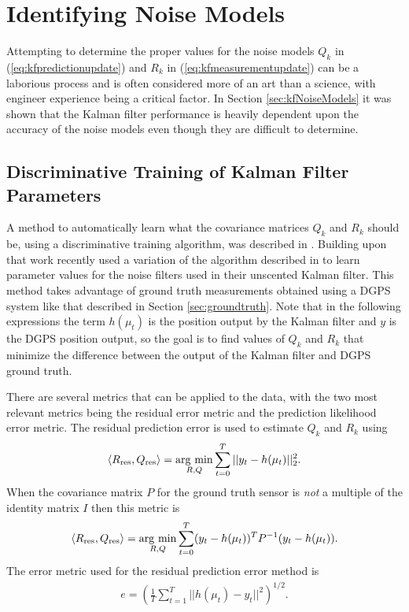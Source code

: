 \section{Identifying Noise Models}
\label{sec:kfIdentifyNoiseModels}
Attempting to determine the proper values for the noise models $Q_k$ in (\ref{eq:kfpredictionupdate}) and $R_k$ in (\ref{eq:kfmeasurementupdate}) can be a laborious process and is often considered more of an art than a science, with engineer experience being a critical factor. In Section \ref{sec:kfNoiseModels} it was shown that the Kalman filter performance is heavily dependent upon the accuracy of the noise models even though they are difficult to determine.

\subsection{Discriminative Training of Kalman Filter Parameters}
\label{sec:kftrainingparams}
A method to automatically learn what the covariance matrices $Q_k$ and $R_k$ should be, using a discriminative training algorithm, was described in \cite{Abbeel-RSS-05}. Building upon that work \cite{SakaiKuroda10} recently used a variation of the algorithm described in \cite{Abbeel-RSS-05} to learn parameter values for the noise filters used in their unscented Kalman filter. This method takes advantage of ground truth measurements obtained using a DGPS system like that described in Section \ref{sec:groundtruth}. Note that in the following expressions the term $h(\mu_t)$ is the position output by the Kalman filter and $y$ is the DGPS position output, so the goal is to find values of $Q_k$ and $R_k$ that minimize the difference between the output of the Kalman filter and DGPS ground truth.

There are several metrics that can be applied to the data, with the two most relevant metrics being the residual error metric and the prediction likelihood error metric. The residual prediction error is used to estimate $Q_k$ and $R_k$ using
\begin{align*}
\left<R_{\text{res}},Q_{\text{res}}\right> = \mathop{\arg\,\min}\limits_{R,Q}\sum_{t=0}^T ||y_t-h(\mu_t)||_2^2.
\end{align*}
When the covariance matrix $P$ for the ground truth sensor is \textit{not} a multiple of the identity matrix $I$ then this metric is
\begin{align*}
\left<R_{\text{res}},Q_{\text{res}}\right> = \mathop{\arg\,\min}\limits_{R,Q}\sum_{t=0}^T (y_t-h(\mu_t))^TP^{-1}(y_t-h(\mu_t)).
\end{align*}
The error metric used for the residual prediction error method is
\begin{align}
\label{eq:kftrainingres}
e = \left(\frac{1}{T}\sum_{t=1}^T ||h(\mu_t)-y_t||^2\right)^{1/2}.
\end{align}

